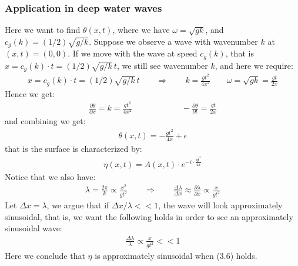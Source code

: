 \documentclass[11pt]{book}
\theoremstyle{break}
\theoremstyle{break}
\begin{document}
\subsubsection{Application in deep water waves}
Here we want to find $\theta(x,t)$, where we have $\omega = \sqrt{gk}$, and $c_g(k) = (1/2)\sqrt{g/k}$. Suppose we observe a wave with wavenumber $k$ at $(x,t) = (0,0)$. If we move with the wave at speed $c_g(k)$, that is $x = c_g(k) \cdot t = (1/2) \sqrt{g/k} \, t$, we still see wavenumber $k$, and here we require:
\begin{align*}
x = c_g(k) \cdot t = (1/2) \sqrt{g/k} \, t \qquad \Rightarrow \qquad k =\frac{gt^2}{4x^2} \qquad \omega = \sqrt{gk}=\frac{gt}{2x}
\end{align*}
Hence we get:
\begin{align*}
\frac{\partial \theta}{\partial x} = k = \frac{gt^2}{4x^2} \qquad\qquad\qquad -\frac{\partial \theta}{\partial t} = \frac{gt}{2x} 
\end{align*}
and combining we get:
\begin{align*}
\theta(x,t) = -\frac{gt^2}{4x}+\epsilon
\end{align*}
that is the surface is characterized by:
\begin{align}
\eta(x,t) = A(x,t)\cdot e^{-i \cdot \frac{gt^2}{4x}}
\end{align}
Notice that we also have:
\begin{align*}
\lambda = \frac{2\pi}{k} \propto \frac{x^2}{gt^2} \qquad \Rightarrow \qquad \frac{\Delta \lambda}{\Delta x} \approx \frac{\partial \lambda}{\partial x} \propto \frac{x}{gt^2}
\end{align*}
Let $\Delta x = \lambda$, we argue that if $\Delta x/\lambda <<1 $, the wave will look approximately sinusoidal, that is, we want the following holds in order to see an approximately sinusoidal wave:
\begin{align}
\frac{\Delta \lambda}{\lambda} \propto \frac{x}{gt^2} << 1 
\end{align}
Here we conclude that $\eta$ is approximately sinusoidal when (3.6) holds. \\

\hfill\break
\end{document}
